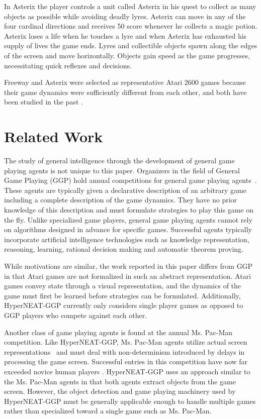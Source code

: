 \documentclass{sig-alternate}
\begin{document}
In Asterix the player controls a unit called Asterix in his quest to collect as many objects as possible while avoiding deadly lyres. Asterix can move in any of the four cardinal directions and receives 50 score whenever he collects a magic potion. Asterix loses a life when he touches a lyre and when Asterix has exhausted his supply of lives the game ends. Lyres and collectible objects spawn along the edges of the screen and move horizontally. Objects gain speed as the game progresses, necessitating quick reflexes and decisions.

Freeway and Asterix were selected as representative Atari 2600 games because their game dynamics were sufficiently different from each other, and both have been studied in the past \cite{naddaf10}. 


\section{Related Work}
\label{sec:background}
The study of general intelligence through the development of general game playing agents is not unique to this paper. Organizers in the field of General Game Playing (GGP) hold annual competitions for general game playing agents~\cite{genesereth05}. These agents are typically given a declarative description of an arbitrary game including a complete description of the game dynamics. They have no prior knowledge of this description and must formulate strategies to play this game on the fly. Unlike specialized game players, general game playing agents cannot rely on algorithms designed in advance for specific games. Successful agents typically incorporate artificial intelligence technologies such as knowledge representation, reasoning, learning, rational decision making and automatic theorem proving. 

While motivations are similar, the work reported in this paper differs from GGP in that Atari games are not formalized in such an abstract representation. Atari games convey state through a visual representation, and the dynamics of the game must first be learned before strategies can be formulated. Additionally, HyperNEAT-GGP currently only considers single player games as opposed to GGP players who compete against each other.

Another class of game playing agents is found at the annual Ms. Pac-Man competition. Like HyperNEAT-GGP, Ms. Pac-Man agents utilize actual screen representations~\cite{pacmancompetition} and must deal with non-determinism introduced by delays in processing the game screen. Successful entries in this competition have now far exceeded novice human players \cite{sigevolution2007}. HyperNEAT-GGP uses an approach similar to the Ms. Pac-Man agents in that both agents extract objects from the game screen. However, the object detection and game playing machinery used by HyperNEAT-GGP must be generally applicable enough to handle multiple games rather than specialized toward a single game such as Ms. Pac-Man.
\end{document}
